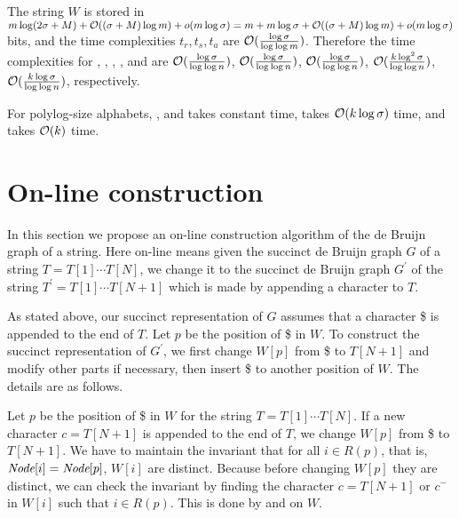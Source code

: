 The string $W$ is stored in $m \log (2\sigma+M) +
\mathcal{O}((\sigma+M) \log m) + o(m \log\sigma)
 = m + m \log\sigma + \mathcal{O}((\sigma+M) \log m) + o(m \log\sigma)$ bits,
and the time complexities $t_r, t_s, t_a$ are 
$\mathcal{O}(\frac{\log\sigma}{\log\log m})$.
Therefore the time complexities for {\cdeg}, {\pdeg}, {\child}, {\parent},
and {\search} are $\mathcal{O}(\frac{\log\sigma}{\log\log n})$, 
$\mathcal{O}(\frac{\log\sigma}{\log\log n})$, 
$\mathcal{O}(\frac{\log\sigma}{\log\log n})$, 
$\mathcal{O}(\frac{k\log^2\sigma}{\log\log n})$,
$\mathcal{O}(\frac{k\log\sigma}{\log\log n})$, respectively.

For polylog-size alphabets, {\cdeg}, {\pdeg} and {\child} takes constant time,
{\parent} takes $\mathcal{O}(k \log \sigma)$ time,
and {\search} takes $\mathcal{O}(k)$ time.



\section{On-line construction}
In this section we propose an on-line construction algorithm of the de Bruijn graph of a string.
Here on-line means given the succinct de Bruijn graph $G$ of a string $T = T[1] \cdots T[N]$, we change it
to the succinct de Bruijn graph $G^\prime$ of the string $T^\prime = T[1] \cdots T[N+1]$ which is made by
appending a character to $T$.
%

As stated above, our succinct representation of $G$ assumes that a character \$ is appended
to the end of $T$.  Let $p$ be the position of \$ in $W$.
To construct the succinct representation of $G^\prime$,
we first change $W[p]$ from \$ to $T[N+1]$ and modify other parts if necessary,
then insert \$ to another position of $W$.  The details are as follows.

Let $p$ be the position of \$ in $W$ for the string $T = T[1] \cdots T[N]$.
If a new character $c = T[N+1]$ is appended to the end of $T$, we change $W[p]$ from \$ to $T[N+1]$.
We have to maintain the invariant that for all $i \in R(p)$, that is, ${\textit{Node}}[i] = {\textit{Node}}[p]$,
$W[i]$ are distinct.
Because before changing $W[p]$ they are distinct, we can check the invariant by finding the character
$c = T[N+1]$ or $c^-$ in $W[i]$ such that $i \in R(p)$.  This is done by {\rank} and {\select} on $W$.

